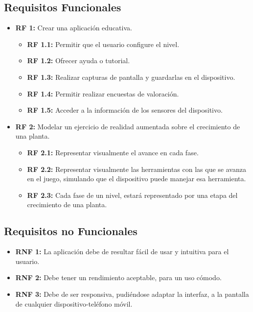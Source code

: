 \subsection{Requisitos Funcionales}
 \begin{itemize}
	\item \textbf{RF 1:} Crear una aplicación educativa.
	\begin{itemize}
	\item \textbf{RF 1.1:} Permitir que el usuario configure el nivel.
	\item \textbf{RF 1.2:} Ofrecer ayuda o tutorial.	
	\item \textbf{RF 1.3:} Realizar capturas de pantalla y guardarlas en el dispositivo.
	\item \textbf{RF 1.4:} Permitir realizar encuestas de valoración.
	\item \textbf{RF 1.5:} Acceder a la información de los sensores del dispositivo.
	
	\end{itemize} 
	\item \textbf{RF 2:} Modelar un ejercicio de realidad aumentada sobre el crecimiento de una planta.
	\begin{itemize}
	\item \textbf{RF 2.1:} Representar visualmente el avance en cada fase.
	\item \textbf{RF 2.2:} Representar visualmente las herramientas con las que se avanza en el juego, simulando que el dispositivo puede manejar esa herramienta.
	\item \textbf{RF 2.3:} Cada fase de un nivel, estará representado por una etapa del crecimiento de una planta.
	
	\end{itemize} 
	
	
\end{itemize}
\subsection{Requisitos no Funcionales}
\begin{itemize}
	\item \textbf{RNF 1:} La aplicación debe de resultar fácil de usar y intuitiva para el usuario.
	\item \textbf{RNF 2:} Debe tener un rendimiento aceptable, para un uso cómodo.
	\item \textbf{RNF 3:} Debe de ser responsiva, pudiéndose adaptar la interfaz, a la pantalla de cualquier dispositivo-teléfono móvil.
\end{itemize}
